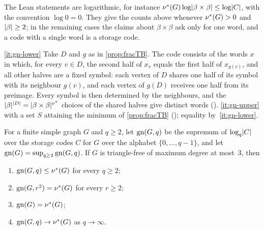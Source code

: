 The Lean statements are logarithmic, for instance $\nu^{*}(G)\log\lvert \beta\times\beta \rvert\le\log\lvert C \rvert$, with the
convention $\log0=0$. They give the counts above whenever $\nu^{*}(G)>0$ and $\lvert \beta \rvert\ge2$; in the remaining cases the
claims about $\beta\times\beta$ ask only for one word, and a code with a single word is a storage code.

\begin{outline}
\ref{it:gn-lower} Take $D$ and $g$ as in \cref{prop:fracTB}. The code consists of the words $x$ in which, for every
$v\in D$, the second half of $x_v$ equals the first half of $x_{g(v)}$, and all other halves are a fixed symbol: each
vertex of $D$ shares one half of its symbol with its neighbour $g(v)$, and each vertex of $g(D)$ receives one half from
its preimage. Every symbol is then determined by the neighbours, and the $\lvert \beta \rvert^{\lvert D \rvert}=
\lvert \beta\times\beta \rvert^{\nu^{*}}$ choices of the shared halves give distinct words
().
\ref{it:gn-upper}  with a set $S$ attaining the minimum of \cref{prop:fracTB}
(); equality by~\ref{it:gn-lower}.
\end{outline}

\begin{corollary}\label{cor:gn}
For a finite simple graph $G$ and $q\ge2$, let $\mathrm{gn}(G,q)$ be the supremum of $\log_q\lvert C \rvert$ over the storage codes $C$
for $G$ over the alphabet $\{0,\dots,q-1\}$, and let $\mathrm{gn}(G)=\sup_{q\ge2}\mathrm{gn}(G,q)$. If $G$ is triangle-free of maximum
degree at most~$3$, then
\begin{enumerate}[label=(\alph*)]
\item\label{it:gnq} $\mathrm{gn}(G,q)\le\nu^{*}(G)$ for every $q\ge2$;
\item\label{it:gnsq} $\mathrm{gn}(G,r^2)=\nu^{*}(G)$ for every $r\ge2$;
\item\label{it:gnsup} $\mathrm{gn}(G)=\nu^{*}(G)$;
\item\label{it:gnlim} $\mathrm{gn}(G,q)\to\nu^{*}(G)$ as $q\to\infty$.
\end{enumerate}
\end{corollary}

